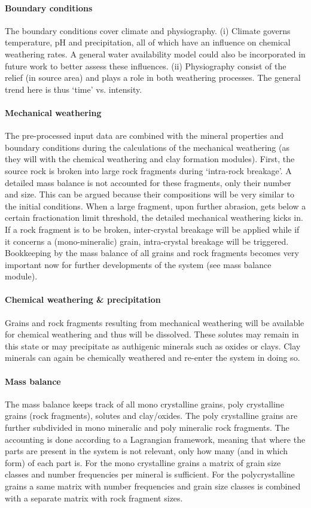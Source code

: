 \paragraph{Boundary conditions}
The boundary conditions cover climate and physiography. %
(i) Climate governs temperature, pH and precipitation, all of which have an influence on chemical weathering rates. %
A general water availability model could also be incorporated in future work to better assess these influences. %
(ii) Physiography consist of the relief (in source area) and plays a role in both weathering processes. %
The general trend here is thus ‘time’ vs. intensity.%

\paragraph{Mechanical weathering}
The pre-processed input data are combined with the mineral properties and boundary conditions during the calculations of the mechanical weathering (as they will with the chemical weathering and clay formation modules). %
First, the source rock is broken into large rock fragments during ‘intra-rock breakage’. %
A detailed mass balance is not accounted for these fragments, only their number and size. %
This can be argued because their compositions will be very similar to the initial conditions. %
When a large fragment, upon further abrasion, gets below a certain fractionation limit threshold, the detailed mechanical weathering kicks in. %
If a rock fragment is to be broken, inter-crystal breakage will be applied while if it concerns a (mono-mineralic) grain, intra-crystal breakage will be triggered. %
Bookkeeping by the mass balance of all grains and rock fragments becomes very important now for further developments of the system (see mass balance module). %

\paragraph{Chemical weathering \& precipitation}
Grains and rock fragments resulting from mechanical weathering will be available for chemical weathering and thus will be dissolved. %
These solutes may remain in this state or may precipitate as authigenic minerals such as oxides or clays. %
Clay minerals can again be chemically weathered and re-enter the system in doing so. %

\paragraph{Mass balance}
The mass balance keeps track of all mono crystalline grains, poly crystalline grains (rock fragments), solutes and clay/oxides. %
The poly crystalline grains are further subdivided in mono mineralic and poly mineralic rock fragments. %
The accounting is done according to a Lagrangian framework, meaning that where the parts are present in the system is not relevant, only how many (and in which form) of each part is. %
For the mono crystalline grains a matrix of grain size classes and number frequencies per mineral is sufficient. %
For the polycrystalline grains a same matrix with number frequencies and grain size classes is combined with a separate matrix with rock fragment sizes. %

